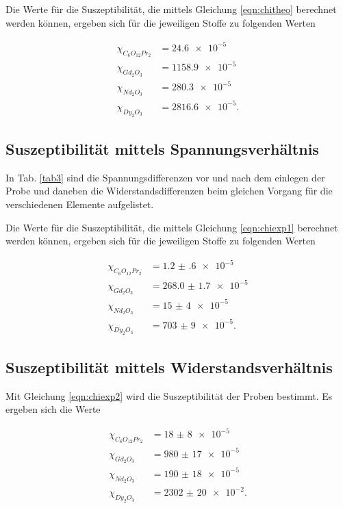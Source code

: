 
\noindent Die Werte für die Suszeptibilität, die mittels Gleichung \eqref{eqn:chitheo} berechnet werden können, ergeben sich für die jeweiligen Stoffe 
zu folgenden Werten 

\begin{align*} 
   \chi_{C_6 O_{12} Pr_2} &= \num{24.6e-5}\\
   \chi_{Gd_2 O_3} &= \num{1158.9e-5}\\
   \chi_{Nd_2 O_3} &= \num{280.3e-5}\\
   \chi_{Dy_2 O_3} &= \num{2816.6e-5}.
\end{align*}

\subsection{Suszeptibilität mittels Spannungsverhältnis}
In Tab. \ref{tab3} sind die Spannungsdifferenzen vor und nach dem einlegen der Probe und daneben die Widerstandsdifferenzen beim gleichen Vorgang für die verschiedenen Elemente aufgelistet.


\noindent Die Werte für die Suszeptibilität, die mittels Gleichung \eqref{eqn:chiexp1} berechnet werden können, ergeben sich für die jeweiligen Stoffe 
zu folgenden Werten 

\begin{align*} 
   \chi_{C_6 O_{12} Pr_2} &= \num{1.2(6)e-5}\\
   \chi_{Gd_2 O_3} &= \num{268.0(17)e-5}\\
   \chi_{Nd_2 O_3} &= \num{15(4)e-5}\\
   \chi_{Dy_2 O_3} &= \num{703(9)e-5}.
\end{align*}


\subsection{Suszeptibilität mittels Widerstandsverhältnis}
Mit Gleichung \eqref{eqn:chiexp2} wird die Suszeptibilität der Proben bestimmt.
Es ergeben sich die Werte

\begin{align*} 
   \chi_{C_6 O_{12} Pr_2} &= \num{18(8)e-5}\\
   \chi_{Gd_2 O_3} &= \num{980(17)e-5}\\
   \chi_{Nd_2 O_3} &= \num{190(18)e-5}\\
   \chi_{Dy_2 O_3} &= \num{2302(20)e-2}.
\end{align*}
